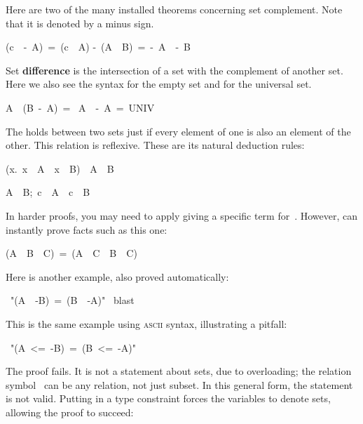 Here are two of the many installed theorems concerning set
complement.
Note that it is denoted by a minus sign.
\begin{isabelle}
(c\ \isasymin\ -\ A)\ =\ (c\ \isasymnotin\ A)
\isanewline
-\ (A\ \isasymunion\ B)\ =\ -\ A\ \isasyminter\ -\ B
\end{isabelle}

Set \textbf{difference} is the intersection
of a set with the  complement of another set. Here we also see the syntax
for the  empty set and for the universal set. 
\begin{isabelle}
A\ \isasyminter\ (B\ -\ A)\ =\ \isacharbraceleft\isacharbraceright
{}\isanewline
A\ \isasymunion\ -\ A\ =\ UNIV%
\end{isabelle}

The  holds between two sets just if every element 
of one is also an element of the other. This relation is reflexive.  These
are its natural deduction rules:
\begin{isabelle}
({\isasymAnd}x.\ x\ \isasymin\ A\ \isasymLongrightarrow\ x\ \isasymin\ B)\ \isasymLongrightarrow\ A\ \isasymsubseteq\ B%
%
\par\smallskip%
\isasymlbrakk A\ \isasymsubseteq\ B;\ c\ \isasymin\
A\isasymrbrakk\ \isasymLongrightarrow\ c\
\isasymin\ B%
\end{isabelle}
In harder proofs, you may need to apply  giving a specific term
for~\isa{c}.  However,  can instantly prove facts such as this
one: 
\begin{isabelle}
(A\ \isasymunion\ B\ \isasymsubseteq\ C)\ =\
(A\ \isasymsubseteq\ C\ \isasymand\ B\ \isasymsubseteq\ C)
\end{isabelle}
Here is another example, also proved automatically:
\begin{isabelle}
\ "(A\
\isasymsubseteq\ -B)\ =\ (B\ \isasymsubseteq\ -A)"\isanewline
\isacommand{by}\ blast
\end{isabelle}
%
This is the same example using \textsc{ascii} syntax, illustrating a pitfall: 
\begin{isabelle}
\ "(A\ <=\ -B)\ =\ (B\ <=\ -A)"
\end{isabelle}
%
The proof fails.  It is not a statement about sets, due to overloading;
the relation symbol~\isa{<=} can be any relation, not just  
subset. 
In this general form, the statement is not valid.  Putting
in a type constraint forces the variables to denote sets, allowing the
proof to succeed:

